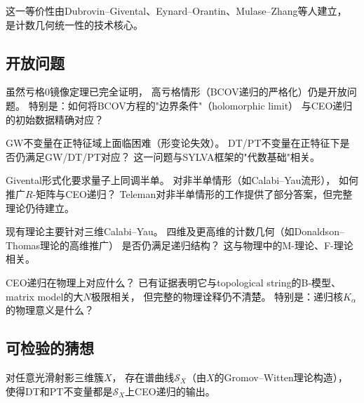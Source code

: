这一等价性由Dubrovin--Givental、Eynard--Orantin、Mulase--Zhang等人建立，
是计数几何统一性的技术核心。

\subsection{开放问题}

\begin{problem}[高亏格镜像对称的完全证明]\label{prob:mirror}
虽然亏格0镜像定理已完全证明，
高亏格情形（BCOV递归的严格化）仍是开放问题。
特别是：如何将BCOV方程的"边界条件"（holomorphic limit）
与CEO递归的初始数据精确对应？
\end{problem}

\begin{problem}[正特征计数几何]\label{prob:poschar}
GW不变量在正特征域上面临困难（形变论失效）。
DT/PT不变量在正特征下是否仍满足GW/DT/PT对应？
这一问题与SYLVA框架的"代数基础"相关。
\end{problem}

\begin{problem}[非半单Frobenius流形]\label{prob:nonsimplex}
Givental形式化要求量子上同调半单。
对非半单情形（如Calabi--Yau流形），
如何推广$R$-矩阵与CEO递归？
Teleman对非半单情形的工作提供了部分答案，但完整理论仍待建立。
\end{problem}

\begin{problem}[高维计数几何]\label{prob:highdim}
现有理论主要针对三维Calabi--Yau。
四维及更高维的计数几何（如Donaldson--Thomas理论的高维推广）
是否仍满足递归结构？
这与物理中的M-理论、F-理论相关。
\end{problem}

\begin{problem}[递归与物理对偶]\label{prob:physics}
CEO递归在物理上对应什么？
已有证据表明它与topological string的B-模型、
matrix model的大$N$极限相关，
但完整的物理诠释仍不清楚。
特别是：递归核$K_\alpha$的物理意义是什么？
\end{problem}

\subsection{可检验的猜想}

\begin{conjecture}\label{conj:dtprec}
对任意光滑射影三维簇$X$，
存在谱曲线$\mathcal{S}_X$（由$X$的Gromov--Witten理论构造），
使得DT和PT不变量都是$\mathcal{S}_X$上CEO递归的输出。
\end{conjecture}

